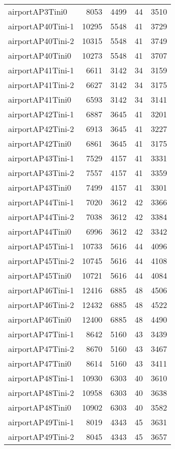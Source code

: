 \begin{longtable}{lrrrr}
airportAP3Tini0 & 8053 & 4499 & 44 & 3510 \\
airportAP40Tini-1 & 10295 & 5548 & 41 & 3729 \\
airportAP40Tini-2 & 10315 & 5548 & 41 & 3749 \\
airportAP40Tini0 & 10273 & 5548 & 41 & 3707 \\
airportAP41Tini-1 & 6611 & 3142 & 34 & 3159 \\
airportAP41Tini-2 & 6627 & 3142 & 34 & 3175 \\
airportAP41Tini0 & 6593 & 3142 & 34 & 3141 \\
airportAP42Tini-1 & 6887 & 3645 & 41 & 3201 \\
airportAP42Tini-2 & 6913 & 3645 & 41 & 3227 \\
airportAP42Tini0 & 6861 & 3645 & 41 & 3175 \\
airportAP43Tini-1 & 7529 & 4157 & 41 & 3331 \\
airportAP43Tini-2 & 7557 & 4157 & 41 & 3359 \\
airportAP43Tini0 & 7499 & 4157 & 41 & 3301 \\
airportAP44Tini-1 & 7020 & 3612 & 42 & 3366 \\
airportAP44Tini-2 & 7038 & 3612 & 42 & 3384 \\
airportAP44Tini0 & 6996 & 3612 & 42 & 3342 \\
airportAP45Tini-1 & 10733 & 5616 & 44 & 4096 \\
airportAP45Tini-2 & 10745 & 5616 & 44 & 4108 \\
airportAP45Tini0 & 10721 & 5616 & 44 & 4084 \\
airportAP46Tini-1 & 12416 & 6885 & 48 & 4506 \\
airportAP46Tini-2 & 12432 & 6885 & 48 & 4522 \\
airportAP46Tini0 & 12400 & 6885 & 48 & 4490 \\
airportAP47Tini-1 & 8642 & 5160 & 43 & 3439 \\
airportAP47Tini-2 & 8670 & 5160 & 43 & 3467 \\
airportAP47Tini0 & 8614 & 5160 & 43 & 3411 \\
airportAP48Tini-1 & 10930 & 6303 & 40 & 3610 \\
airportAP48Tini-2 & 10958 & 6303 & 40 & 3638 \\
airportAP48Tini0 & 10902 & 6303 & 40 & 3582 \\
airportAP49Tini-1 & 8019 & 4343 & 45 & 3631 \\
airportAP49Tini-2 & 8045 & 4343 & 45 & 3657 \\

\end{longtable}
